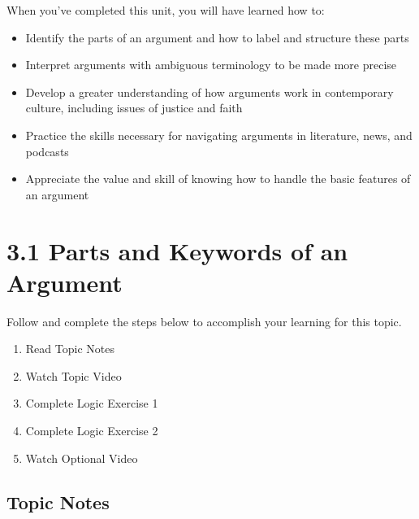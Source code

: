 \documentclass[
]{book}
\providecommand{\tightlist}{%
  \setlength{\itemsep}{0pt}\setlength{\parskip}{0pt}}
\begin{document}
When you've completed this unit, you will have learned how to:

\begin{itemize}
\tightlist
\item
  Identify the parts of an argument and how to label and structure these parts
\item
  Interpret arguments with ambiguous terminology to be made more precise
\item
  Develop a greater understanding of how arguments work in contemporary culture, including issues of justice and faith
\item
  Practice the skills necessary for navigating arguments in literature, news, and podcasts
\item
  Appreciate the value and skill of knowing how to handle the basic features of an argument
\end{itemize}

\hypertarget{parts-and-keywords-of-an-argument}{%
\section*{3.1 Parts and Keywords of an Argument}\label{parts-and-keywords-of-an-argument}}

Follow and complete the steps below to accomplish your learning for this topic.

\begin{enumerate}
\def\labelenumi{\arabic{enumi}.}
\tightlist
\item
  Read Topic Notes
\item
  Watch Topic Video
\item
  Complete Logic Exercise 1
\item
  Complete Logic Exercise 2
\item
  Watch Optional Video
\end{enumerate}

\hypertarget{topic-notes-8}{%
\subsection*{Topic Notes}\label{topic-notes-8}}
\end{document}
